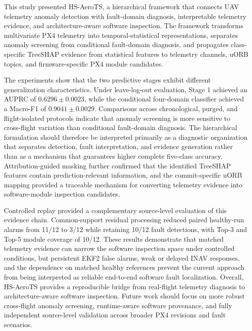 This study presented HS-AeroTS, a hierarchical framework that connects UAV telemetry anomaly detection with fault-domain diagnosis, interpretable telemetry evidence, and architecture-aware software inspection. The framework transforms multivariate PX4 telemetry into temporal-statistical representations, separates anomaly screening from conditional fault-domain diagnosis, and propagates class-specific TreeSHAP evidence from statistical features to telemetry channels, uORB topics, and firmware-specific PX4 module candidates.

The experiments show that the two predictive stages exhibit different generalization characteristics. Under leave-log-out evaluation, Stage 1 achieved an AUPRC of $0.6296\pm0.0023$, while the conditional four-domain classifier achieved a Macro-F1 of $0.9041\pm0.0029$. Comparisons across chronological, purged, and flight-isolated protocols indicate that anomaly screening is more sensitive to cross-flight variation than conditional fault-domain diagnosis. The hierarchical formulation should therefore be interpreted primarily as a diagnostic organization that separates detection, fault interpretation, and evidence generation rather than as a mechanism that guarantees higher complete five-class accuracy. Attribution-guided masking further confirmed that the identified TreeSHAP features contain prediction-relevant information, and the commit-specific uORB mapping provided a traceable mechanism for converting telemetry evidence into software-module inspection candidates.

Controlled replay provided a complementary source-level evaluation of this evidence chain. Common-support residual processing reduced paired healthy-run alarms from 11/12 to 3/12 while retaining 10/12 fault detections, with Top-3 and Top-5 module coverage of 10/12. These results demonstrate that matched telemetry evidence can narrow the software inspection space under controlled conditions, but persistent EKF2 false alarms, weak or delayed INAV responses, and the dependence on matched healthy references prevent the current approach from being interpreted as reliable end-to-end software fault localization. Overall, HS-AeroTS provides a reproducible bridge from real-flight telemetry diagnosis to architecture-aware software inspection. Future work should focus on more robust cross-flight anomaly screening, runtime-aware software provenance, and fully independent source-level validation across broader PX4 revisions and fault scenarios.
